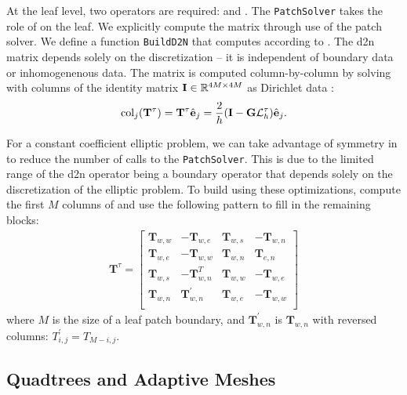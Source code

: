 At the leaf level, two operators are required: \Stau and \Ttau. The \texttt{PatchSolver} takes the role of \Stau on the leaf. We explicitly compute the matrix \Ttau through use of the patch solver. We define a function \texttt{BuildD2N} that computes \Ttau according to . The \gls{d2n} matrix depends solely on the discretization -- it is independent of boundary data or inhomogenenous data. The matrix \Ttau is computed column-by-column by solving  with columns of the identity matrix $\textbf{I} \in \mathbb R^{4M \times 4M}$ as Dirichlet data \gtau:
\begin{align}
\text{col}_j (\mathbf T^{\tau}) = \mathbf T^{\tau} \hat{\textbf{e}}_j = \frac{2}{h} (\textbf{I} - \textbf{G} \mathcal{L}_h^{\tau}) \hat{\textbf{e}}_j.
\end{align}

For a constant coefficient elliptic problem, we can take advantage of symmetry in \Ttau to reduce the number of calls to the \texttt{PatchSolver}. This is due to the limited range of the \gls{d2n} operator being a boundary operator that depends solely on the discretization of the elliptic problem. To build \Ttau using these optimizations, compute the first $M$ columns of \Ttau and use the following pattern to fill in the remaining blocks:
\begin{align}
\textbf{T}^{\tau} =
\begin{bmatrix}
    \textbf{T}_{w,w} & -\textbf{T}_{w,e} & \textbf{T}_{w,s} & -\textbf{T}_{w,n} \\
    \textbf{T}_{w,e} & -\textbf{T}_{w,w} & \textbf{T}_{w,n} & \textbf{T}_{e,n} \\
    \textbf{T}_{w,s} & -\textbf{T}_{w,n}^T & \textbf{T}_{w,w} & -\textbf{T}_{w,e} \\
    \textbf{T}_{w,n} & \textbf{T}_{w,n}^{'} & \textbf{T}_{w,e} & -\textbf{T}_{w,w} \\
\end{bmatrix}
\end{align}
where $M$ is the size of a leaf patch boundary, and $\textbf{T}_{w,n}^{'}$ is $\textbf{T}_{w,n}$ with reversed columns: $T_{i,j}^{'} = T_{M-i,j}$.

\subsection{Quadtrees and Adaptive Meshes}
\label{sub:quadtrees-and-adaptive-meshes}

